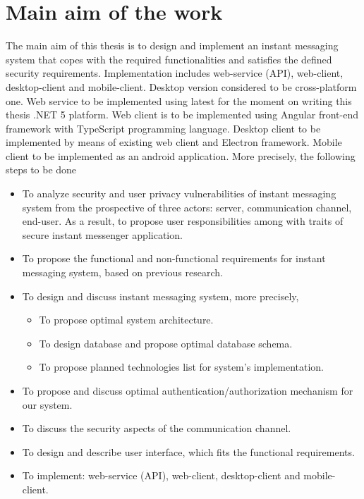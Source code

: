 \chapter{Main aim of the work}\label{ch:main-aim-of-the-work}

The main aim of this thesis is to design and implement an instant messaging system
that copes with the required functionalities and satisfies the defined security requirements.
Implementation includes web-service (API), web-client, desktop-client and mobile-client.
Desktop version considered to be cross-platform one.
Web service to be implemented using latest for the moment on writing this thesis .NET 5 platform.
Web client is to be implemented using Angular front-end framework with TypeScript programming language.
Desktop client to be implemented by means of existing web client and Electron framework.
Mobile client to be implemented as an android application.
More precisely, the following steps to be done
\begin{itemize}
    \item To analyze security and user privacy vulnerabilities of instant messaging system from the prospective of three
    actors: server, communication channel, end-user.
    As a result, to propose user responsibilities among with traits of secure instant messenger application.
    \item To propose the functional and non-functional requirements for instant messaging system, based on previous
    research.
    \item To design and discuss instant messaging system, more precisely,
    \begin{itemize}
        \item To propose optimal system architecture.
        \item To design database and propose optimal database schema.
        \item To propose planned technologies list for system's implementation.
    \end{itemize}
    \item To propose and discuss optimal authentication/authorization mechanism for our system.
    \item To discuss the security aspects of the communication channel.
    \item To design and describe user interface, which fits the functional requirements.
    \item To implement: web-service (API), web-client, desktop-client and mobile-client.
\end{itemize}